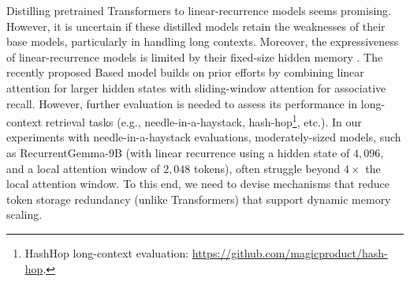 Distilling pretrained Transformers to linear-recurrence models \citep{zhang_hedgehog_2024,wang_mamba_2024,zhang_lolcats_2024,bick_transformers_2024} seems promising.
%
However, it is uncertain if these distilled models retain the weaknesses of their base models, particularly in handling long contexts.
%
Moreover, the expressiveness of linear-recurrence models is limited by their fixed-size hidden memory \citet{jelassi_repeat_2024}.
%
The recently proposed Based model \citep{arora_simple_2024} builds on prior efforts by combining linear attention for larger hidden states with sliding-window attention for associative recall.
%
However, further evaluation is needed to assess its performance in long-context retrieval tasks (e.g., needle-in-a-haystack, hash-hop\footnote{HashHop long-context evaluation: \url{https://github.com/magicproduct/hash-hop}.}, etc.).
%
In our experiments with needle-in-a-haystack evaluations, moderately-sized models, such as RecurrentGemma-$9$B (with linear recurrence using a hidden state of $4,096$, and a local attention window of $2,048$ tokens), often struggle beyond $4\times$ the local attention window.
%
To this end, we need to devise mechanisms that reduce token storage redundancy (unlike Transformers) that support dynamic memory scaling.

